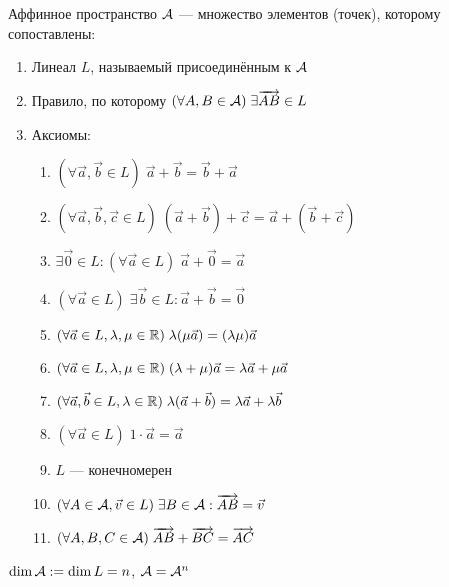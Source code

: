 \documentclass{article}
\begin{document}


Аффинное пространство $\mathcal{A}$ --- множество элементов (точек), которому сопоставлены:
\begin{enumerate}
	\item{}Линеал $L$, называемый присоединённым к $\mathcal{A}$
	\item{}Правило, по которому $(\forall A,B\in\mathcal{A})\;\exists\overrightarrow{AB}\in L$
	\item{}Аксиомы:
	\begin{enumerate}[label=\Roman*.]
		\item{}$(\forall \vec{a},\vec{b}\in L)\;\vec{a}+\vec{b}=\vec{b}+\vec{a}$
		\item{}$(\forall \vec{a},\vec{b},\vec{c}\in L)\;(\vec{a}+\vec{b})+\vec{c}=\vec{a}+(\vec{b}+\vec{c})$
		\item{}$\exists \vec{0}\in L:(\forall \vec{a}\in L)\;\vec{a}+\vec{0}=\vec{a}$
		\item{}$(\forall \vec{a}\in L)\;\exists \vec{b}\in L:\vec{a}+\vec{b}=\vec{0}$
		\item{}$(\forall \vec{a}\in L,\lambda, \mu\in\mathbb{R})\;\lambda(\mu\vec{a})=(\lambda\mu)\vec{a}$
		\item{}$(\forall \vec{a}\in L,\lambda,\mu\in\mathbb{R})\;(\lambda+\mu)\vec{a}=\lambda\vec{a}+\mu\vec{a}$
		\item{}$(\forall \vec{a},\vec{b}\in L,\lambda\in\mathbb{R})\;\lambda(\vec{a}+\vec{b})=\lambda\vec{a}+\lambda\vec{b}$
		\item{}$(\forall \vec{a}\in L)\;1\cdot\vec{a}=\vec{a}$

		\item{}$L$ --- конечномерен
		\item{}$(\forall A\in\mathcal{A},\vec{v}\in L)\;\exists B\in\mathcal{A}:\overrightarrow{AB}=\vec{v}$
		\item{}$(\forall A,B,C\in\mathcal{A})\;\overrightarrow{AB}+\overrightarrow{BC}=\overrightarrow{AC}$
	\end{enumerate}
\end{enumerate}

$\dim\mathcal{A}:=\dim L=n$, $\mathcal{A}=\mathcal{A}^{n}$
\end{document}
